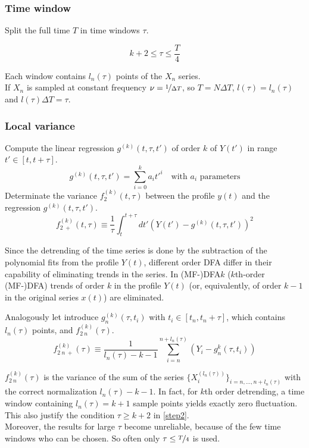 \subsubsection{Time window}\label{step2}
Split the full time $T$ in time windows $\tau$.

\begin{equation}
	k+2 \le \tau \le \frac{T}{4}
\end{equation}

Each window contains $l_n(\tau)$ points of the $X_n$ series. \\
If $X_n$ is sampled at constant frequency $\nu = \nicefrac{1}{\Delta T}$, so $T = N \Delta T$, $l(\tau) = l_n(\tau)$ and $l(\tau) \Delta T = \tau $. 

\subsubsection{Local variance}\label{step3}
Compute the linear regression $ g^{( k )}(t, \tau, t') $ of order $k$ of $Y(t')$ in range $t' \in \left[t, t + \tau \right]$.
\begin{equation}
	g^{( k )}(t, \tau, t') = \sum_{i=0}^{k} a_i t'^{i} \quad \text{with $a_i$ parameters}
\end{equation}
Determinate the variance $ f_2^{( k )}( t, \tau ) $ between the profile $ y(t) $ and the regression $ g^{( k )}(t, \tau, t') $.
\begin{equation}
	f_{2 \ +}^{( k )}( t, \tau ) \equiv \frac{1}{\tau} \int_{t}^{t+\tau} dt' \left( Y( t' ) - g^{( k )}(t, \tau, t')  \right)^2
\end{equation}

Since the detrending of the time series is done by the subtraction of the polynomial fits from the profile $Y(t)$, different order DFA differ in their capability of eliminating trends in the series. In (MF-)DFA$k$ ($k$th-order (MF-)DFA) trends of order $k$ in the profile $Y(t)$ (or, equivalently, of order $k-1$ in the original series $x(t)$) are eliminated. 

Analogously let introduce $g_n^{(k)}(\tau, t_i)$ with $t_i \in [t_n, t_n + \tau]$, which contains $l_n(\tau)$ points, and $f_{2\ n}^{( k )}( \tau )$.
\begin{equation}
	f_{2\ n \ +}^{( k )}( \tau ) \equiv \frac{1}{l_n(\tau) - k - 1} \sum_{i=n}^{n + l_n(\tau)} \left(Y_i - g_n^{k} (\tau, t_i) \right)
\end{equation}

$f_{2\ n}^{( k )}( \tau )$ is the variance of the sum of the series $\{ X^{(l_n(\tau))}_i\}_{i= n, \dots, n+l_n(\tau)} $ with the correct normalization $l_n(\tau) - k - 1$. In fact, for $k$th order detrending, a time window containing $l_n(\tau) = k + 1$ sample points yields exactly zero fluctuation. This also justify the condition $\tau \ge k+2$ in \autoref{step2}.\\
Moreover, the results for large $\tau$ become unreliable, because of the few time windows who can be chosen. So often only $\tau \le \nicefrac{T}{4}$ is used. 

